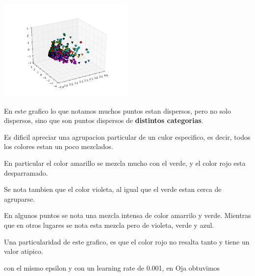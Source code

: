 \includegraphics[width=0.5\textwidth]{img/ej1_sanger_01_240}


En este grafico lo que notamos muchos puntos estan dispersos, pero no solo dispersos, sino que son puntos dispersos de \textbf{distintos categorias}. 

Es dificil apreciar una agrupacion particular de un culor especifico, es decir, todos los colores estan un poco mezclados.

En particular el color amarillo se mezcla mucho con el verde, y el color rojo esta desparramado. 

Se nota tambien que el color violeta, al igual que el verde estan cerca de agruparse.

En algunos puntos se nota una mezcla intensa de color amarrilo y verde. Mientras que en otros lugares se nota esta mezcla pero de violeta, verde y azul.

Una particularidad de este grafico, es que el color rojo no resalta tanto y tiene un valor atipico.

con el mismo epsilon y con un learning rate de 0.001, en Oja obtuvimos 

